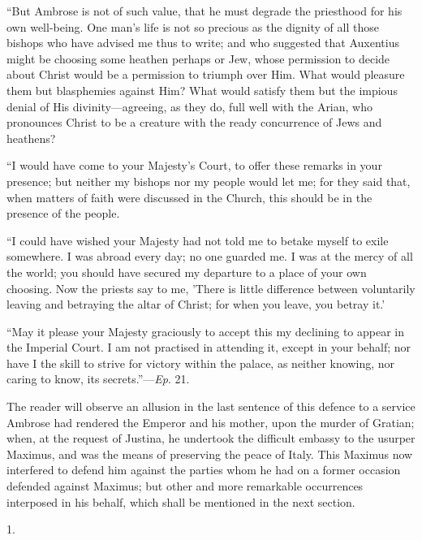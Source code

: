 ``But Ambrose is not of such value, that he must degrade the
priesthood for his own well-being. One man's life is not so precious
as the dignity of all those bishops who have advised me thus to write;
and who suggested that Auxentius might be choosing some heathen
perhaps or Jew, whose permission to decide about Christ would be a
permission to triumph over Him. What would pleasure them but
blasphemies against Him? What would satisfy them but the impious
denial of His divinity—agreeing, as they do, full well with the
Arian, who pronounces Christ to be a creature with the ready
concurrence of Jews and heathens?

``I would have come to your Majesty's Court, to offer these
remarks in your presence; but neither my bishops nor my people would
let me; for they said that, when matters of faith were discussed in
the Church, this should be in the presence of the people.

``I could have wished your Majesty had not told me to betake
myself to exile somewhere. I was abroad every day; no one guarded me.
I was at the mercy of all the world; you should have secured my
departure to a place of your own choosing. Now the priests say to me,
'There is little difference between voluntarily leaving and betraying
the altar of Christ; for when you leave, you betray it.'

``May it please your Majesty graciously to accept this my
declining to appear in the Imperial Court. I am not practised in
attending it, except in your behalf; nor have I the skill to strive
for victory within the palace, as neither knowing, nor caring to know,
its secrets.''—\emph{Ep}. 21.

The reader will observe an allusion in the last sentence of this
defence to a service Ambrose had rendered the Emperor and his mother,
upon the murder of Gratian; when, at the request of Justina, he
undertook the difficult embassy to the usurper Maximus, and was
the means of preserving the peace of Italy. This Maximus now
interfered to defend him against the parties whom he had on a former
occasion defended against Maximus; but other and more remarkable
occurrences interposed in his behalf, which shall be mentioned in the
next section.


1.


